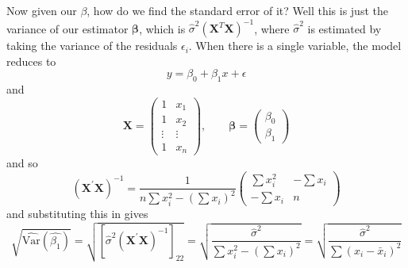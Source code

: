   Now given our $\beta$, how do we find the standard error of it? Well this is just the variance of our estimator $\boldsymbol{\beta}$, which is $\hat{\sigma}^2 (\mathbf{X}^T \mathbf{X})^{-1}$, where $\hat{\sigma}^2$ is estimated by taking the variance of the residuals $\epsilon_i$. When there is a single variable, the model reduces to 
  \begin{equation}
    y = \beta_0 + \beta_1 x + \epsilon
  \end{equation}
  and 
  \begin{equation}
    \mathbf{X} = \left(
      \begin{array}{cc}
      1 & x_1 \\
      1 & x_2 \\
      \vdots & \vdots \\
      1 & x_n
      \end{array}
      \right), \qquad \boldsymbol{\beta} = \left(
      \begin{array}{c}
      \beta_0 \\ \beta_1
      \end{array}
      \right)
  \end{equation}
  and so 
  \begin{equation}
    (\mathbf{X}^{\prime} \mathbf{X})^{-1} = \frac{1}{n\sum x_i^2 - (\sum x_i)^2}
      \left(
      \begin{array}{cc}
      \sum x_i^2 & -\sum x_i \\
      -\sum x_i  & n
      \end{array}
      \right)
  \end{equation}
  and substituting this in gives 
  \begin{equation}
    \sqrt{\widehat{\textrm{Var}}(\hat{\beta_1})} = \sqrt{[\hat{\sigma}^2  (\mathbf{X}^{\prime} \mathbf{X})^{-1}]_{22}} = \sqrt{\frac{\hat{\sigma}^2}{\sum x_i^2 - (\sum x_i)^2}} = \sqrt{\frac{\hat{\sigma}^2}{\sum (x_i - \bar{x}_i)^2}}
  \end{equation}

